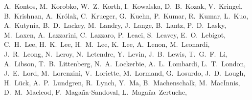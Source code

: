 {A.~Kontos,  %
M.~Korobko,  %
W.~Z.~Korth,  %
I.~Kowalska, %
D.~B.~Kozak,  %
V.~Kringel,  %
B.~Krishnan,  %
A.~Kr\'olak, %
C.~Krueger,  %
G.~Kuehn,  %
P.~Kumar,  %
R.~Kumar,  %
L.~Kuo,  %
A.~Kutynia, %
B.~D.~Lackey,  %
M.~Landry,  %
J.~Lange,  %
B.~Lantz,  %
P.~D.~Lasky,  %
M.~Laxen,  %
A.~Lazzarini,  %
C.~Lazzaro, %
P.~Leaci, %
S.~Leavey,  %
E.~O.~Lebigot,  %
C.~H.~Lee,  %
H.~K.~Lee,  %
H.~M.~Lee,  %
K.~Lee,  %
A.~Lenon,  %
M.~Leonardi, %
J.~R.~Leong,  %
N.~Leroy, %
N.~Letendre, %
Y.~Levin,  %
J.~B.~Lewis,  %
T.~G.~F.~Li,  %
A.~Libson,  %
T.~B.~Littenberg,  %
N.~A.~Lockerbie,  %
A.~L.~Lombardi,  %
L.~T.~London,  %
J.~E.~Lord,  %
M.~Lorenzini, %
V.~Loriette, %
M.~Lormand,  %
G.~Losurdo, %
J.~D.~Lough,  %
H.~L\"uck,  %
A.~P.~Lundgren,  %
R.~Lynch,  %
Y.~Ma,  %
B.~Machenschalk,  %
M.~MacInnis,  %
D.~M.~Macleod,  %
F.~Maga\~na-Sandoval,  %
L.~Maga\~na~Zertuche,  %
}
